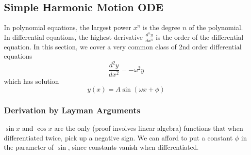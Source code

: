 \documentclass{article}
\begin{document}
\subsection{Simple Harmonic Motion ODE}
In polynomial equations, the largest power $x^n$ is the degree $n$ of the polynomial. In differential equations, the highest derivative $\frac{d^n y}{dx^n}$ is the order of the differential equation. In this section, we cover a very common class of 2nd order differential equations
$$\frac{d^2 y}{dx^2} = -\omega^2 y$$
which has solution
$$y(x) = A\sin(\omega x + \phi)$$
\subsubsection{Derivation by Layman Arguments}
$\sin x$ and $\cos x$ are the only (proof involves linear algebra) functions that when differentiated twice, pick up a negative sign. We can afford to put a constant $\phi$ in the parameter of $\sin$, since constants vanish when differentiated. 
\end{document}
